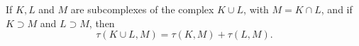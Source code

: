 If $K, L$ and $M$ are subcomplexes of the complex $K \cup L$, with $M = K \cap L$, and if $K \supset M$ and $L \supset M$, then
$$\tau(K \cup L, M) = \tau(K, M) + \tau(L, M).$$
